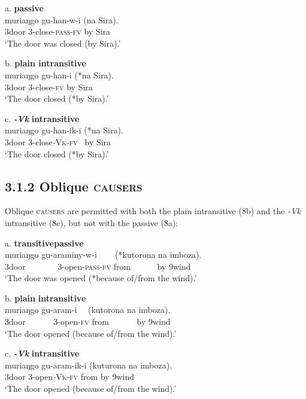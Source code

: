 \documentclass[output=paper]{langsci/langscibook}
\begin{document}
\ea
{  a. \textbf{passive}}\\
\gll muriaŋgo gu-han-w-i            (na Sira).\\
     3door       3-close-\textsc{pass}{}-\textsc{fv}    by  Sira\\
\glt ‘The door was closed (by Sira).’
\z

\ea
{  b.\textbf{ plain intransitive}}\\
\gll muriaŋgo gu-han-i   (*na Sira).\\
     3door      3-close-\textsc{fv}   by   Sira\\
\glt ‘The door closed (*by Sira).’
\z


\ea
{c. \textbf{\textit{{}-Vk}}\textbf{ intransitive}}\\
\gll muriaŋgo gu-han-ik-i     (*na Sira).\\
     3door       3-close\textit{{}-}\textsc{Vk}{}-\textsc{fv}~ by  Sira\\
     ‘The door closed (*by Sira).’\\
\z


\subsection{3.1.2 Oblique \textsc{causers}}

Oblique \textsc{causers} are permitted with both the plain intransitive (8b) and the \textit{{}-Vk} intransitive (8c), but not with the passive (8a):


\ea
{  a. \textbf{transitive}\textbf{passive}}\\
\gll muriaŋgo gu-araminy-w-i ~~ ~(*kutorona na imboza).\\
     3door ~~~~~~~3-open-\textsc{pass}{}-\textsc{fv}      from ~~~~~ by 9wind\\
\glt ‘The door was opened (*because of/from the wind).’
\z

\ea
{b. \textbf{plain }\textbf{intransitive}}\\
\gll muriaŋgo gu-aram-i ~~(kutorona na imboza).\\
     3door ~~~~~~3-open-\textsc{fv}    from ~~~~~~by 9wind\\
\glt ‘The door opened (because of/from the wind).’
\z

\ea
{c. \textbf{\textit{{}-Vk}} \textbf{intransitive}}\\
\gll muriaŋgo gu-aram-ik-i    (kuturona na imboza).\\
     3door       3-open\textit{{}-}\textsc{Vk}{}-\textsc{fv}   from       by 9wind\\
\glt ‘The door opened (because of/from the wind).’
\z
 
\end{document}
